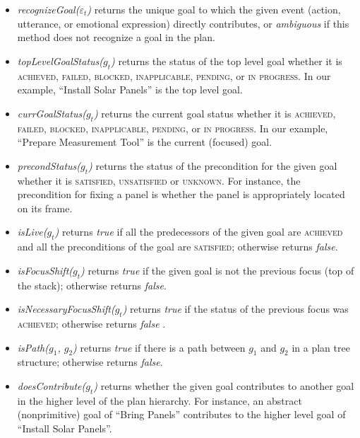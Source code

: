 \begin{itemize}[leftmargin=2pt]
  \setlength\itemsep{0.2mm}
  \item \textit{recognizeGoal($\varepsilon_t$)} returns the unique goal to which
  the given event (action, utterance, or emotional expression) directly
  contributes, or \textit{ambiguous} if this method does not recognize a goal in
  the plan.
  
  \item \textit{topLevelGoalStatus($g_t$)} returns the status of the top level
  goal whether it is \textsc{achieved, failed, blocked, inapplicable, pending,}
  or \textsc{in progress}.
  In our example, ``Install Solar Panels'' is the top level goal.
  
  \item \textit{currGoalStatus($g_t$)} returns the current goal status whether
  it is \textsc{achieved, failed, blocked, inapplicable, pending,} or \textsc{in
  progress}. In our example, ``Prepare Measurement Tool'' is the current
  (focused) goal.
  
  \item \textit{precondStatus($g_t$)} returns the status of the precondition for
  the given goal whether it is \textsc{satisfied, unsatisfied} or
  \textsc{unknown}. For instance, the precondition for fixing a panel is whether
  the panel is appropriately located on its frame.
  
  \item \textit{isLive($g_t$)} returns \textit{true} if all the predecessors of
  the given goal are \textsc{achieved} and all the preconditions of the goal are
  \textsc{satisfied}; otherwise returns \textit{false}.
  
  \item \textit{isFocusShift($g_t$)} returns \textit{true} if the given
  goal is not the previous focus (top of the stack); otherwise returns
  \textit{false}.
  
  \item \textit{isNecessaryFocusShift($g_t$)} returns \textit{true} if the
  status of the previous focus was \textsc{achieved}; otherwise returns
  \textit{false} \cite{rich:focused-unfocused-users}.
  
  \item \textit{isPath($g_1$, $g_2$)} returns \textit{true} if there is a path
  between $g_1$ and $g_2$ in a plan tree structure; otherwise returns
  \textit{false}.
  
  \item \textit{doesContribute($g_t$)} returns whether the given goal
  contributes to another goal in the higher level of the plan hierarchy. For
  instance, an abstract (nonprimitive) goal of ``Bring Panels'' contributes to
  the higher level goal of ``Install Solar Panels''.
  

\end{itemize}
